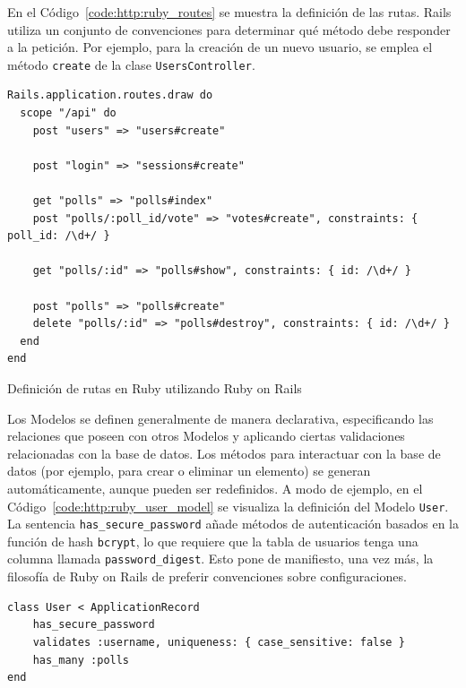 \documentclass[11pt]{article}
\begin{document}
En el Código~\ref{code:http:ruby_routes} se muestra la definición de las rutas. Rails utiliza un conjunto de convenciones para determinar qué método debe responder a la petición. Por ejemplo, para la creación de un nuevo usuario, se emplea el método \lstinline{create} de la clase \lstinline{UsersController}.

\begin{listing}
\begin{verbatim}
Rails.application.routes.draw do
  scope "/api" do
    post "users" => "users#create"

    post "login" => "sessions#create"

    get "polls" => "polls#index"
    post "polls/:poll_id/vote" => "votes#create", constraints: { poll_id: /\d+/ }

    get "polls/:id" => "polls#show", constraints: { id: /\d+/ }

    post "polls" => "polls#create"
    delete "polls/:id" => "polls#destroy", constraints: { id: /\d+/ }
  end
end
\end{verbatim}
\caption{Definición de rutas en Ruby utilizando Ruby on Rails}
\label{code:http:ruby_routes}
\end{listing}

Los Modelos se definen generalmente de manera declarativa, especificando las relaciones que poseen con otros Modelos y aplicando ciertas validaciones relacionadas con la base de datos. Los métodos para interactuar con la base de datos (por ejemplo, para crear o eliminar un elemento) se generan automáticamente, aunque pueden ser redefinidos. A modo de ejemplo, en el Código~\ref{code:http:ruby_user_model} se visualiza la definición del Modelo \lstinline{User}. La sentencia \lstinline{has_secure_password} añade métodos de autenticación basados en la función de hash \lstinline{bcrypt}, lo que requiere que la tabla de usuarios tenga una columna llamada \lstinline{password_digest}. Esto pone de manifiesto, una vez más, la filosofía de Ruby on Rails de preferir convenciones sobre configuraciones.

\begin{listing}
\begin{verbatim}
class User < ApplicationRecord
    has_secure_password
    validates :username, uniqueness: { case_sensitive: false }
    has_many :polls
end
\end{verbatim}
\caption{Definición del Modelo \lstinline{User} en Ruby on Rails}
\label{code:http:ruby_user_model}
\end{listing}
\end{document}
